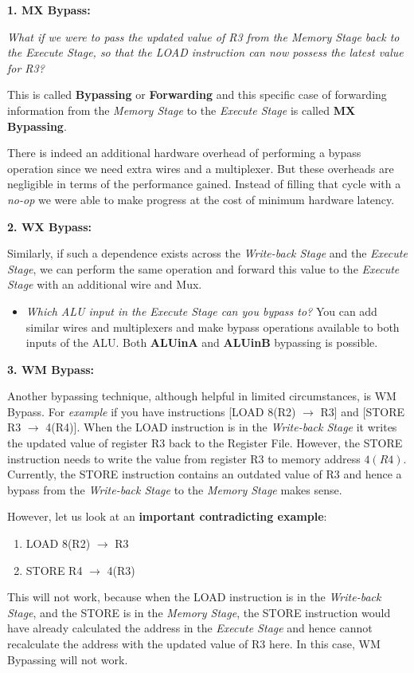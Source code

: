 \documentclass[12pt]{article}
\newenvironment{QandA}{\begin{enumerate}[label=\bfseries\arabic*.]\bfseries}
                      {\end{enumerate}}
\newenvironment{answered}{\par\quad\normalfont}{}
\begin{document}
\begin{QandA}
\begin{answered}
    \textbf{1. MX Bypass:}
    
    \textit{What if we were to pass the updated value of R3 from the Memory Stage back to the Execute Stage, so that the LOAD instruction can now possess the latest value for R3?}
    
    This is called \textbf{Bypassing} or \textbf{Forwarding} and this specific case of forwarding information from the \textit{Memory Stage} to the \textit{Execute Stage} is called \textbf{MX Bypassing}.
    
    There is indeed an additional hardware overhead of performing a bypass operation since we need extra wires and a multiplexer. But these overheads are negligible in terms of the performance gained. Instead of filling that cycle with a \textit{no-op} we were able to make progress at the cost of minimum hardware latency. 
    
    \textbf{2. WX Bypass:}
    
    Similarly, if such a dependence exists across the \textit{Write-back Stage} and the \textit{Execute Stage}, we can perform the same operation and forward this value to the \textit{Execute Stage} with an additional wire and Mux. 
    
    \begin{itemize}
        \item \textit{Which ALU input in the Execute Stage can you bypass to?} You can add similar wires and multiplexers and make bypass operations available to both inputs of the ALU. Both \textbf{ALUinA} and \textbf{ALUinB} bypassing is possible. 
    \end{itemize}
    
    \textbf{3. WM Bypass:}
    
    Another bypassing technique, although helpful in limited circumstances, is WM Bypass. For \textit{example} if you have instructions [LOAD 8(R2) $\rightarrow$ R3] and [STORE R3 $\rightarrow$ 4(R4)]. When the LOAD instruction is in the \textit{Write-back Stage} it writes the updated value of register R3 back to the Register File. However, the STORE instruction needs to write the value from register R3 to memory address $4(R4)$. Currently, the STORE instruction contains an outdated value of R3 and hence a bypass from the \textit{Write-back Stage} to the \textit{Memory Stage} makes sense.
    
    However, let us look at an \textbf{important contradicting example}:
    \begin{enumerate}
        \item LOAD 8(R2) $\rightarrow$ R3
        \item STORE R4 $\rightarrow$ 4(R3)
    \end{enumerate}
    This will not work, because when the LOAD instruction is in the \textit{Write-back Stage}, and the STORE is in the \textit{Memory Stage}, the STORE instruction would have already calculated the address in the \textit{Execute Stage} and hence cannot recalculate the address with the updated value of R3 here. In this case, WM Bypassing will not work.
    \end{answered}
    

\end{QandA}
\end{document}
